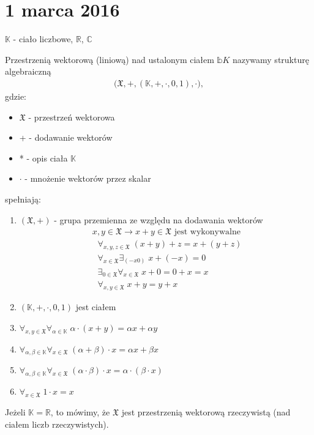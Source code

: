 \chapter{1 marca 2016}
$ \mathbb K $ - ciało liczbowe, $ \mathbb R $, $ \mathbb C $
\begin{defi}
Przestrzenią wektorową (liniową) nad ustalonym ciałem $ \mathbb bK $ nazywamy strukturę algebraiczną\begin{gather*}
\bigl(\mathfrak X,+,\left(\mathbb K,+,\cdot,0,1\right),\cdot\bigr),
\end{gather*}
gdzie:
\begin{itemize}
\item $ \mathfrak X $ - przestrzeń wektorowa
\item + - dodawanie wektorów
\item * - opis ciała $ \mathbb K $
\item $ \cdot $ - mnożenie wektorów przez skalar
\end{itemize}
spełniają:
\begin{enumerate}
\item $ (\mathfrak X,+) $ - grupa przemienna ze względu na dodawania wektorów
\begin{gather*}
x,y\in\mathfrak X\to x+y\in \mathfrak X\text{ jest wykonywalne}
\end{gather*}
\begin{align*}
&\forall_{x,y,z\in\mathfrak X}\;(x+y)+z=x+(y+z)\\
&\forall_{x\in \mathfrak X}\exists_{(-x0)}\;x+(-x)=0\\
&\exists_{0\in \mathfrak X}\forall_{x\in\mathfrak X}\;x+0=0+x=x\\
&\forall_{x,y\in\mathfrak X}\;x+y=y+x
\end{align*}
\item $ \left(\mathbb K,+,\cdot,0,1\right) $ jest ciałem
\item $ \forall_{x,y\in\mathfrak X}\forall_{\alpha\in\mathbb K}\;\alpha\cdot(x+y)=\alpha x+\alpha y $
\item $ \forall_{\alpha,\beta\in\mathbb K}\forall_{x\in \mathfrak X}\;(\alpha+\beta)\cdot x=\alpha x+\beta x $
\item $ \forall_{\alpha,\beta\in\mathbb K}\forall_{x\in \mathfrak X}\;(\alpha\cdot \beta)\cdot x=\alpha\cdot(\beta\cdot x) $
\item $ \forall_{x\in\mathfrak X}\;1\cdot x=x $
\end{enumerate}
\end{defi}
Jeżeli $ \mathbb K=\mathbb R  $, to mówimy, że $ \mathfrak X $ jest przestrzenią wektorową rzeczywistą (nad ciałem liczb rzeczywistych).\\
